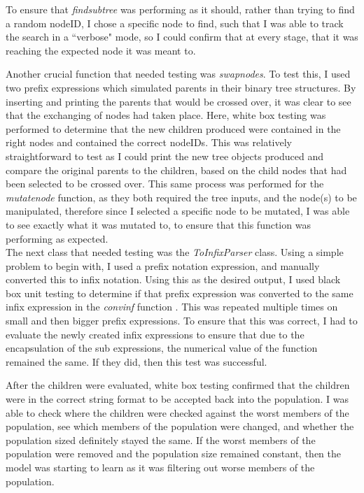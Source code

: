 \documentclass[11pt]{article}
\begin{document}
To ensure that \textit{find\textunderscore subtree} was performing as it should, rather than trying to find a random nodeID, I chose a specific node to find, such that I was able to track the search in a ``verbose" mode, so I could confirm that at every stage, that it was reaching the expected node it was meant to.

Another crucial function that needed testing was \textit{swap\textunderscore nodes}. To test this, I used two prefix expressions which simulated parents in their binary tree structures. By inserting and printing the parents that would be crossed over, it was clear to see that the exchanging of nodes had taken place. Here, white box testing was performed to determine that the new children produced were contained in the right nodes and contained the correct nodeIDs. This was relatively straightforward to test as I could print the new tree objects produced and compare the original parents to the children, based on the child nodes that had been selected to be crossed over.  This same process was performed for the \textit{mutate\textunderscore node} function, as they both required the tree inputs, and the node(s) to be manipulated, therefore since I selected a specific node to be mutated, I was able to see exactly what it was mutated to, to ensure that this function was performing as expected.\\
The next class that needed testing was the \textit{ToInfixParser} class. Using a simple problem to begin with, I used a prefix notation expression, and manually converted this to infix notation. Using this as the desired output, I used black box unit testing to determine if that prefix expression was converted to the same infix expression in the \textit{conv\textunderscore inf}  function . This was repeated multiple times on small and then bigger prefix expressions. To ensure that this was correct, I had to evaluate the newly created infix expressions to ensure that due to the encapsulation of the sub expressions, the numerical value of the function remained the same. If they did, then this test was successful. 

After the children were evaluated, white box testing confirmed that the children were in the correct string format to be accepted back into the population. I was able to check where the children were checked against the worst members of the population, see which members of the population were changed, and whether the population sized definitely stayed the same. If the worst members of the population were removed and the population size remained constant, then the model was starting to learn as it was filtering out worse members of the population. 
\end{document}
